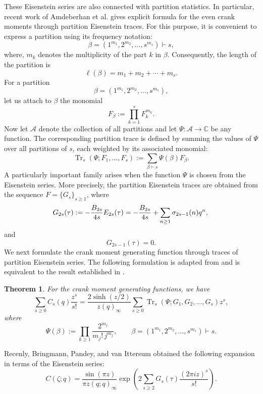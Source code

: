 \documentclass[12pt,oneside,reqno]{amsart}
\numberwithin{equation}{section}
\newtheorem{theorem}{Theorem}[section]
\begin{document}
These Eisenstein series are also connected with partition statistics.
In particular, recent work of Amdeberhan et al.\cite{Amdeberhan2025} gives explicit formula for the even crank moments through partition Eisenstein traces. For this purpose, it is convenient to express a partition using its frequency notation:
\[
\beta=(1^{m_1},2^{m_2},\ldots,s^{m_s})\vdash s,
\]
where, $m_k$ denotes the multiplicity of the part $k$ in $\beta$.
 Consequently, the length of the partition is
\[
\ell(\beta)=m_1+m_2+\cdots+m_s.
\]
For a partition
\[
\beta=(1^{m_1},2^{m_2},\ldots,s^{m_s}),
\]
let us attach to $\beta$ the monomial
\[
F_\beta:=\prod_{k=1}^{s}F_k^{m_k}.
\]
Now let $\mathscr{A}$ denote the collection of all partitions and let
$\Psi:\mathscr{A}\to\mathbb{C}$ be any function. The corresponding
partition trace is defined by summing the values of $\Psi$ over all
partitions of $s$, each weighted by its associated monomial:
\begin{equation}\label{eq1.13}
	\operatorname{Tr}_{s}(\Psi;F_1,\ldots,F_s)
	:=
	\sum_{\beta\vdash s}\Psi(\beta)F_\beta.
\end{equation}
A particularly important family arises when the function $\Psi$ is
chosen from the Eisenstein series. More precisely, the partition Eisenstein traces are obtained from the sequence
$F=\{G_s\}_{s\geq1}$,
where
\begin{equation}\label{eq1.14}
	G_{2s}(\tau)
	:=
	-\frac{B_{2s}}{4s}E_{2s}(\tau)
	=
	-\frac{B_{2s}}{4s}
	+\sum_{n\geq1}\sigma_{2s-1}(n)q^n,\\
\end{equation}
and
\[
G_{2s-1}(\tau)=0.
\]
We next formulate the crank moment generating function through traces of partition Eisenstein series. The following formulation is adapted from \cite[Theorem~1.1]{Bringmann2025} and is equivalent to the result established in \cite[Theorem~1.2]{Amdeberhan2025}.

\begin{theorem}\label{thm1}
	For the crank moment generating functions, we have
	\begin{equation}\label{eq1.15}
		\sum_{s\geq0}C_s(q)\frac{z^s}{s!}
		=
		\frac{2\sinh(z/2)}{z(q)_\infty}
		\sum_{s\geq0}
		\operatorname{Tr}_s
		(\Psi;G_1,G_2,\ldots,G_s)z^s,
	\end{equation}
	where
	\[
	\Psi(\beta)
	:=
	\prod_{k\geq1}
	\frac{2^{m_j}}{m_j!\,j^{m_j}},
	\qquad
	\beta=(1^{m_1},2^{m_2},\ldots,s^{m_s})\vdash s.
	\]
\end{theorem}

Recenly, Bringmann, Pandey, and van
Ittersum \cite{Bringmann2025} obtained the following expansion in terms
of the Eisenstein series:
\begin{equation}\label{eq1.16}
	C(\zeta;q)
	=
	\frac{\sin(\pi z)}{\pi z(q;q)_\infty}
	\exp\left(
	2\sum_{s\geq2}
	G_s(\tau)\frac{(2\pi iz)^s}{s!}
	\right).
\end{equation}
\end{document}
